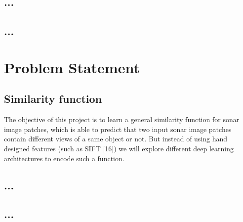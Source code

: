 \lipsum[6-10]

\subsection{...}

\subsection{...}



\section{Problem Statement}
\subsection{Similarity function}

The objective  of this project is to learn a general similarity function for sonar image patches, which is able to predict that two input sonar 
image patches contain different views of a same object or not. But instead of using hand designed features (such as SIFT [16]) 
we will explore different deep learning architectures to encode such a function.

\subsection{...}


\subsection{...}
